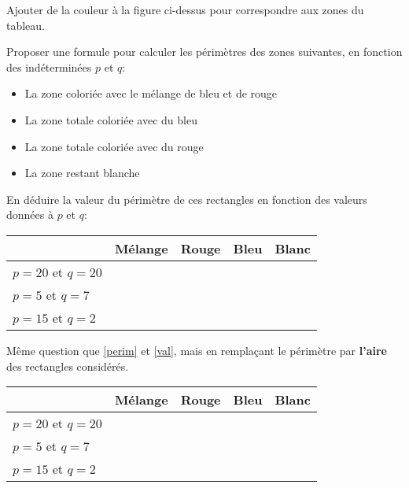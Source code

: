 \documentclass{article}
\begin{document}
\begin{alphaquestions}
\item Ajouter de la couleur à la figure ci-dessus pour correspondre aux zones du tableau.
\item\label{perim} Proposer une formule pour calculer les périmètres des zones suivantes, en fonction des indéterminées $p$ et $q$:
\begin{itemize}
\item La zone coloriée avec le mélange de bleu et de rouge 
\item La zone totale coloriée avec du bleu
\item La zone totale coloriée avec du rouge
\item La zone restant blanche
\end{itemize}
\item\label{val} En déduire la valeur du périmètre de ces rectangles en fonction des valeurs données à $p$ et $q$:
\begin{center}
\begin{tabular}{|l|c|c|c|c|}
\hline
&Mélange&Rouge&Bleu&Blanc\\
\hline
$p = 20$ et $q = 20$&&&&\\
\hline
$p = 5$ et $q = 7$&&&&\\
\hline
$p = 15$ et $q = 2$&&&&\\
\hline
\end{tabular}
\end{center}
\item Même question que \ref{perim} et \ref{val}, mais en remplaçant le périmètre par \textbf{l'aire} des rectangles considérés.
\begin{center}
\begin{tabular}{|l|c|c|c|c|}
\hline
&Mélange&Rouge&Bleu&Blanc\\
\hline
$p = 20$ et $q = 20$&&&&\\
\hline
$p = 5$ et $q = 7$&&&&\\
\hline
$p = 15$ et $q = 2$&&&&\\
\hline
\end{tabular}
\end{center}
\end{alphaquestions}
\hfill\vline\hfill
\end{document}
